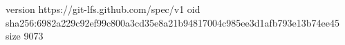 version https://git-lfs.github.com/spec/v1
oid sha256:6982a229c92ef99c800a3cd35e8a21b94817004c985ee3d1afb793e13b74ee45
size 9073
